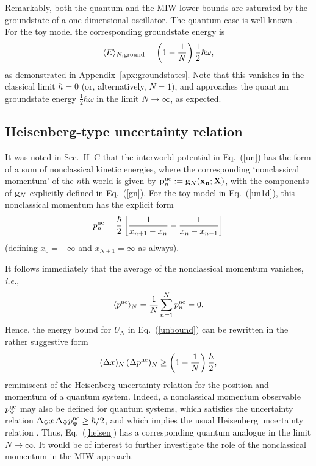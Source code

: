 \documentclass[twocolumn,aps,pra,amsmath,amssymb,superscriptaddress]{revtex4}
\newcommand{\ie}{{\em i.e.}}
\newcommand{\beq}{\begin{equation}}
\newcommand{\eeq}{\end{equation}}
\newcommand{\ro}[1]{\left( {#1} \right)}
\renewcommand{\(}{\left(}
\renewcommand{\)}{\right)}
\newcommand{\blk}{\color{black}}
\begin{document}
Remarkably, both the quantum and the MIW lower bounds are saturated by the groundstate of a one-dimensional oscillator.  The quantum case is well known \cite{merz}.  For the  toy model the corresponding groundstate energy is
\beq \label{enosc}
\langle E\rangle_{N,{\rm ground}} = \left( 1 - \frac{1}{N}\right) \blk \frac{1}{2} \hbar\omega , 
\eeq
as demonstrated in  Appendix~\ref{apx:groundstates}. \blk Note that this vanishes in the classical limit $\hbar =0$ (or, alternatively, $N=1$), and approaches the quantum groundstate energy $\frac{1}{2}\hbar\omega$ in the limit $N\to\infty$, as expected. 

\subsection{Heisenberg-type uncertainty relation}

It was noted in Sec.~II~C that the interworld potential in Eq.~(\ref{un}) has
the form of a sum of nonclassical kinetic energies, where the corresponding
`nonclassical momentum' of the $n$th world  is given by ${\bf p}_n^{\rm
nc}:={\bf g}_N({\bf x_n} ;{\bf X})$, with the components of ${\bf g}_N$
explicitly defined in Eq.~(\ref{gn}). \blk For the toy model in
Eq.~(\ref{un1d}), this nonclassical momentum has the explicit form
\begin{equation} 
    \label{eq:pnc}
p_n^{\rm nc} = \frac{\hbar}{2}\left[ \frac{1}{x_{n+1}-x_n} - \frac{1}{x_{n}-x_{n-1}} \right] 
\end{equation}
(defining $x_0=-\infty$ and $x_{N+1}=\infty$ as always).
 
It follows immediately that the average of the nonclassical momentum vanishes, \ie,
$$\langle p^{\rm nc} \rangle_N = \frac{1}{N}\sum_{n=1}^N p_n^{\rm nc} = 0 . $$
Hence, the energy bound for $U_N$ in Eq.~(\ref{unbound}) can be rewritten in the rather suggestive form
\begin{equation} \label{heisen}
(\Delta x)_N\, (\Delta p^{\rm nc})_N \geq \ro{1-\frac{1}{N}} \blk \frac{\hbar}{2} ,
\end{equation}
reminiscent of the Heisenberg uncertainty relation for the position and momentum of a quantum system.  Indeed, a nonclassical momentum observable $p^{\rm nc}_\Psi$ may also be defined for quantum systems, which satisfies the uncertainty relation $\Delta_\Psi x \,\Delta_\Psi p^{\rm nc}_\Psi \geq \hbar/2$, and which implies the usual Heisenberg uncertainty relation \cite{eur}. Thus,  Eq.~(\ref{heisen}) has a corresponding quantum analogue in the limit $N\to \infty$. It would be of interest to further investigate the role of the nonclassical momentum in the MIW approach.
\end{document}
